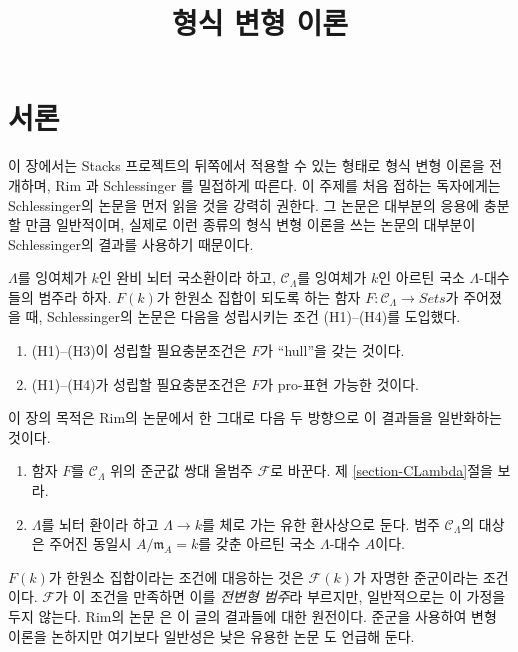 


%


\title{형식 변형 이론}


\maketitle

\label{section-phantom}

\tableofcontents



\section{서론}
\label{section-introduction}

\noindent
이 장에서는 Stacks 프로젝트의 뒤쪽에서 적용할 수 있는 형태로 형식 변형 이론을
전개하며, Rim \cite[Exposee VI]{SGA7-I}과 Schlessinger \cite{Sch}를
밀접하게 따른다. 이 주제를 처음 접하는 독자에게는 Schlessinger의 논문을 먼저
읽을 것을 강력히 권한다. 그 논문은 대부분의 응용에 충분할 만큼 일반적이며,
실제로 이런 종류의 형식 변형 이론을 쓰는 논문의 대부분이 Schlessinger의 결과를
사용하기 때문이다.

\medskip\noindent
$\Lambda$를 잉여체가 $k$인 완비 뇌터 국소환이라 하고,
$\mathcal{C}_\Lambda$를 잉여체가 $k$인 아르틴 국소
$\Lambda$-대수들의 범주라 하자. $F(k)$가 한원소 집합이 되도록 하는 함자
$F : \mathcal{C}_\Lambda \to \textit{Sets}$가 주어졌을 때,
Schlessinger의 논문은 다음을 성립시키는 조건 (H1)--(H4)를 도입했다.
\begin{enumerate}
\item (H1)--(H3)이 성립할 필요충분조건은 $F$가 ``hull''을 갖는 것이다.
\item (H1)--(H4)가 성립할 필요충분조건은 $F$가 pro-표현 가능한 것이다.
\end{enumerate}
이 장의 목적은 Rim의 논문에서 한 그대로 다음 두 방향으로 이 결과들을 일반화하는
것이다.
\begin{enumerate}
\item[(A)] 함자 $F$를 $\mathcal{C}_\Lambda$ 위의 준군값 쌍대 올범주
$\mathcal{F}$로 바꾼다. 제 \ref{section-CLambda}절을 보라.
\item[(B)] $\Lambda$를 뇌터 환이라 하고 $\Lambda \to k$를 체로 가는
유한 환사상으로 둔다. 범주 $\mathcal{C}_\Lambda$의 대상은 주어진 동일시
$A/\mathfrak m_A = k$를 갖춘 아르틴 국소 $\Lambda$-대수 $A$이다.
\end{enumerate}
$F(k)$가 한원소 집합이라는 조건에 대응하는 것은 $\mathcal{F}(k)$가 자명한
준군이라는 조건이다. $\mathcal{F}$가 이 조건을 만족하면 이를
{\it 전변형 범주}라 부르지만, 일반적으로는 이 가정을 두지 않는다.
Rim의 논문 \cite[Exposee VI]{SGA7-I}은 이 글의 결과들에 대한 원전이다.
준군을 사용하여 변형 이론을 논하지만 여기보다 일반성은 낮은 유용한 논문
\cite{Talpo-Vistoli}도 언급해 둔다.


